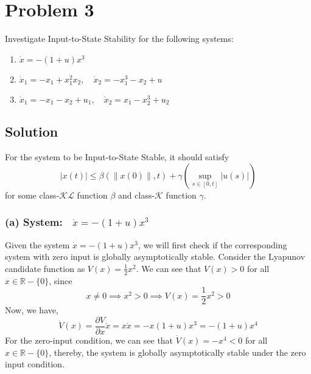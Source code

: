 \section*{Problem 3}

Investigate Input-to-State Stability for the following systems:
\begin{enumerate}[label= (\alph*)]
    \item \( \dot{x}=-(1+u) x^{3} \)
    \item \( \dot{x}_{1}=-x_{1}+x_{1}^{2} x_{2}, \quad \dot{x}_{2}=-x_{1}^{3}-x_{2}+u \)
    \item \( \dot{x}_{1}=-x_{1}-x_{2}+u_{1}, \quad \dot{x}_{2}=x_{1}-x_{2}^{3}+u_{2} \)
\end{enumerate}

\subsection*{Solution}

For the system to be Input-to-State Stable, it should satisfy
\begin{equation*}
    \left| x(t) \right| \leq \beta( \| x(0) \|, t ) + \gamma( \sup_{s \in [0, t]} \left| u(s) \right| )
\end{equation*}
for some class-\( \mathcal{KL} \) function \( \beta \) and class-\( \mathcal{K} \) function \( \gamma \).

\subsubsection*{(a) System:\( \quad \dot{x}=-(1+u) x^{3} \)}

Given the system \( \dot{x}=-(1+u) x^{3} \), we will first check if the corresponding system with zero input is globally asymptotically stable.
Consider the Lyapunov candidate function as \( V(x)=\frac{1}{2} x^{2} \).
We can see that \( V(x) > 0 \) for all \( x \in \mathbb{R} - \{ 0 \} \), since
\begin{equation*}
    x \neq 0
    \implies
    x^2 > 0
    \implies
    V(x)
    =
    \frac{1}{2} x^2 > 0
\end{equation*}
Now, we have,
\begin{equation*}
    \dot{V}(x)
    =
    \frac{\partial V}{\partial x} \dot{x}
    =
    x \dot{x}
    =
    -x (1 + u) x^3
    =
    -(1 + u) x^4
\end{equation*}
For the zero-input condition, we can see that \( \dot{V}(x) = -x^4 < 0 \) for all \( x \in \mathbb{R} - \{ 0 \} \), thereby, the system is globally asymptotically stable under the zero input condition.

